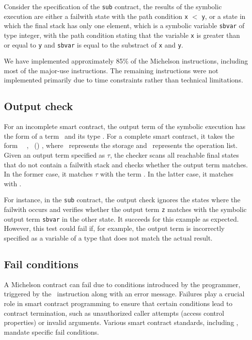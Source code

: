\documentclass[runningheads]{llncs}
\begin{document}
Consider the specification of the \lstinline/sub/ contract, the results of
the symbolic execution are either a failwith state with the path
condition \lstinline/x/ $<$ \lstinline/y/,  or a state in which the
final stack has only one element, which is a symbolic variable
\lstinline/sbvar/ of type integer, with the path condition stating
that the variable \lstinline/x/ is greater than or equal to
\lstinline/y/ and  \lstinline/sbvar/ is equal to
the substract of \lstinline/x/ and \lstinline/y/. 

We have implemented approximately 85\% of the Michelson instructions, including most of the major-use instructions. The remaining instructions were not implemented primarily due to time constraints rather than technical limitations.

\subsection{Output check}
\label{sec:output-check}
For an incomplete smart contract, the output term of the symbolic execution has the form of a term \Term\ and its type \TY. For a complete smart contract, it takes the form \PAIR\ \VOPERATIONLIST\ \VSTORAGE, \TPAIR\ (\TOPERATIONLIST) \TYS, where \VSTORAGE\ represents the storage and \VOPERATIONLIST\ represents the operation list. Given an output term specified as $\tau$, the checker scans all reachable final states that do not contain a failwith stack and checks whether the output term matches. In the former case, it matches $\tau$ with the term \Term. In the latter case, it matches with \VSTORAGE. 

For instance, in the \lstinline|sub| contract, the output check ignores the states where the failwith occurs and verifies whether the output term \lstinline|z| matches with the symbolic output term \lstinline/sbvar/ in the other state. It succeeds for this example as expected. However, this test could fail if, for example, the output term is incorrectly specified as a variable of a type that does not match the actual result.

\subsection{Fail conditions}
\label{sec:fail-conditions}
A Michelson contract can fail due to conditions introduced by the programmer, triggered by the \FAILWITH\ instruction along with an error message. Failures play a crucial role in smart contract programming to ensure that certain conditions lead to contract termination, such as unauthorized caller attempts (access control properties) or invalid arguments. Various smart contract standards, including \cite{erc,fa}, mandate specific fail conditions.
\end{document}
